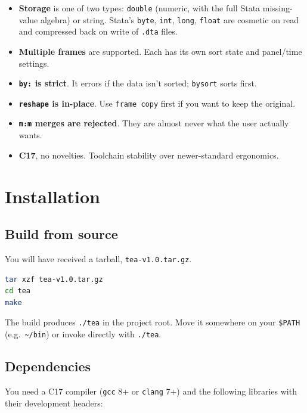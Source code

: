 \documentclass[11pt,letterpaper]{article}
\newcommand{\teaversion}{1.0}
\begin{document}
\begin{itemize}
\item \textbf{Storage} is one of two types: \texttt{double} (numeric, with
the full Stata missing-value algebra) or string.  Stata's \texttt{byte},
\texttt{int}, \texttt{long}, \texttt{float} are cosmetic on read and
compressed back on write of \texttt{.dta} files.
\item \textbf{Multiple frames} are supported.  Each has its own sort
state and panel/time settings.
\item \textbf{\texttt{by:} is strict}.  It errors if the data isn't
sorted; \texttt{bysort} sorts first.
\item \textbf{\texttt{reshape} is in-place}.  Use \texttt{frame copy}
first if you want to keep the original.
\item \textbf{\texttt{m:m} merges are rejected}.  They are almost never
what the user actually wants.
\item \textbf{C17}, no novelties.  Toolchain stability over
newer-standard ergonomics.
\end{itemize}

\section{Installation}

\subsection{Build from source}

You will have received a tarball, \texttt{tea-v\teaversion.tar.gz}.

\begin{lstlisting}[language=bash]
tar xzf tea-v1.0.tar.gz
cd tea
make
\end{lstlisting}

The build produces \texttt{./tea} in the project root.  Move it
somewhere on your \texttt{\$PATH} (e.g.\ \texttt{\textasciitilde/bin})
or invoke directly with \texttt{./tea}.

\subsection{Dependencies}

You need a C17 compiler (\texttt{gcc} 8+ or \texttt{clang} 7+) and the
following libraries with their development headers:
\end{document}
